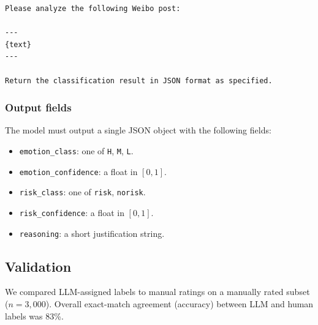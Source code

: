 \begin{verbatim}
Please analyze the following Weibo post:

---
{text}
---

Return the classification result in JSON format as specified.
\end{verbatim}

\subsubsection{Output fields}

The model must output a single JSON object with the following fields:
\begin{itemize}
  \item \texttt{emotion\_class}: one of \texttt{H}, \texttt{M}, \texttt{L}.
  \item \texttt{emotion\_confidence}: a float in $[0,1]$.
  \item \texttt{risk\_class}: one of \texttt{risk}, \texttt{norisk}.
  \item \texttt{risk\_confidence}: a float in $[0,1]$.
  \item \texttt{reasoning}: a short justification string.
\end{itemize}

\subsection{Validation}

We compared LLM-assigned labels to manual ratings on a manually rated subset ($n=3{,}000$). Overall exact-match agreement (accuracy) between LLM and human labels was 83\%.

